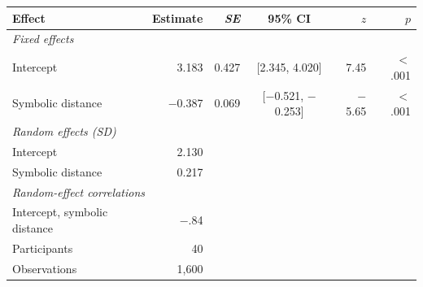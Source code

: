 \begin{tabular}{lrrcrr}
\toprule
Effect & Estimate & \textit{SE} & 95\% CI & $z$ & $p$ \\
\midrule
\multicolumn{6}{l}{\textit{Fixed effects}} \\
\quad Intercept & 3.183 & 0.427 & [2.345, 4.020] & 7.45 & $<$.001 \\
\quad Symbolic distance & $-$0.387 & 0.069 & [$-$0.521, $-$0.253] & $-$5.65 & $<$.001 \\
\multicolumn{6}{l}{\textit{Random effects (SD)}} \\
\quad Intercept & 2.130 \\
\quad Symbolic distance & 0.217 \\
\multicolumn{6}{l}{\textit{Random-effect correlations}} \\
\quad Intercept, symbolic distance & $-$.84 \\
\midrule
Participants & 40 \\
Observations & 1,600 \\
\bottomrule
\end{tabular}
